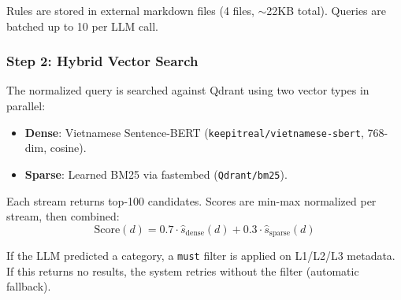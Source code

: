 Rules are stored in external markdown files (4 files, $\sim$22KB total). Queries are batched up to 10 per LLM call.

\subsubsection{Step 2: Hybrid Vector Search}

The normalized query is searched against Qdrant using two vector types in parallel:
\begin{itemize}
    \item \textbf{Dense}: Vietnamese Sentence-BERT (\texttt{keepitreal/vietnamese-sbert}, 768-dim, cosine).
    \item \textbf{Sparse}: Learned BM25 via fastembed (\texttt{Qdrant/bm25}).
\end{itemize}

Each stream returns top-100 candidates. Scores are min-max normalized per stream, then combined:
\begin{equation}
\text{Score}(d) = 0.7 \cdot \hat{s}_{\text{dense}}(d) + 0.3 \cdot \hat{s}_{\text{sparse}}(d)
\end{equation}

If the LLM predicted a category, a \texttt{must} filter is applied on L1/L2/L3 metadata. If this returns no results, the system retries without the filter (automatic fallback).
